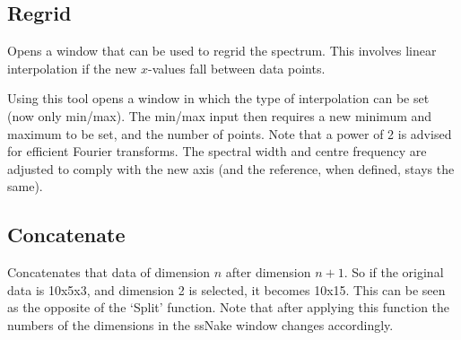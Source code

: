 \documentclass[11pt,a4paper]{article}
\begin{document}
\subsection{Regrid}
Opens a window that can be used to regrid the spectrum.
This involves linear interpolation if the new $x$-values fall between data points.



Using this tool opens a window in which the type of interpolation can be set (now only min/max).
The min/max input then requires a new minimum and maximum to be set, and the number of points.
Note that a power of 2 is advised for efficient Fourier transforms.
The spectral width and centre frequency are adjusted to comply with the new axis (and the reference, when defined, stays the same).

\subsection{Concatenate}
Concatenates that data of dimension $n$ after dimension $n+1$.
So if the original data is 10x5x3, and dimension 2 is selected, it becomes 10x15.
This can be seen as the opposite of the `Split' function.
Note that after applying this function the numbers of the dimensions in the ssNake window changes accordingly.
\end{document}
